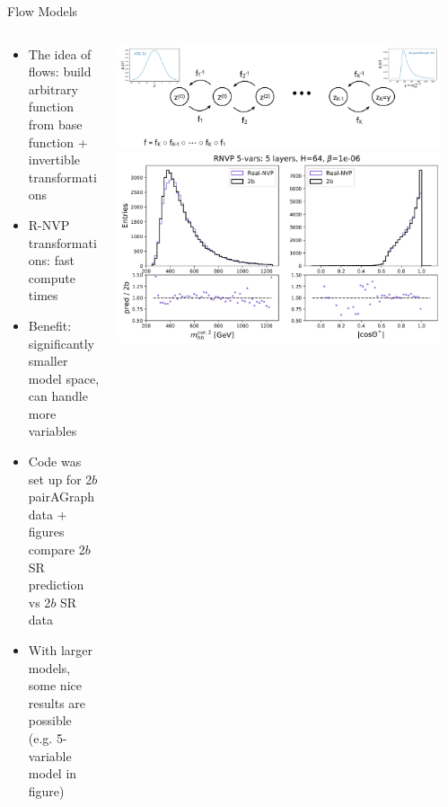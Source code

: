 \documentclass[10pt, aspectratio=169]{beamer}
\begin{document}
{
\begin{frame}{Flow Models}
  \begin{columns}[onlytextwidth]
    \begin{column}{0.6\textwidth}
      \begin{itemize}
        \item The idea of \alert{flows}: build arbitrary function from base function + invertible transformations
        \item \alert{R-NVP} transformations: fast compute times
        \item Benefit: significantly smaller model space, can handle more variables
        \item Code was set up for 2$b$ \alert{pairAGraph} data + figures compare 2$b$ SR prediction vs 2$b$ SR data
        \item With larger models, some nice results are possible (e.g. 5-variable model in figure)
      \end{itemize}
    \end{column}
    \begin{column}{0.4\textwidth}
      \centering
      \includegraphics[width=\linewidth, trim=0 0 0cm 0cm, clip]{images/nicole_pres_screenshot.png}
      \includegraphics[width=0.7\linewidth, trim=0 0 45cm 4cm, clip]{images/nicole_histogram.png}
    \end{column}
​  \end{columns}
\end{frame}
}
\end{document}
